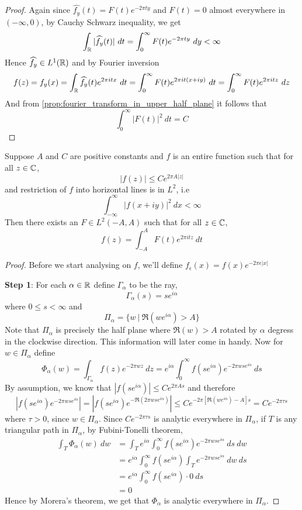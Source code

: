 \begin{proof}
  Again since $\widehat{f_y}(t) = F(t)e^{-2\pi ty}$ and $F(t) = 0$ almost everywhere in $(-\infty, 0)$, by Cauchy Schwarz inequality, we get
  $$\int_\mathbb R |\widehat{f_y}(t)| \ dt = \int_{0}^\infty F(t) e^{-2\pi ty} \ dy < \infty$$
  Hence $\widehat{f_y} \in L^1(\mathbb R)$ and by Fourier inversion
  $$f(z) = f_y(x) = \int_\mathbb R \widehat{f_y}(t) e^{2\pi it x}\ dt = \int_0^\infty F(t)e^{2\pi it(x+iy)} \ dt = \int_{0}^\infty F(t)e^{2\pi itz} \ dz$$
  And from \autoref{prop:fourier_transform_in_upper_half_plane} it follows that $$\int_0^\infty |F(t)|^2 \ dt = C$$
\end{proof}

\begin{theorem}
  \label{thm:paley_wiener_2}
  Suppose $A$ and $C$ are positive constants and $f$ is an entire function such that for all $z \in \mathbb C$, $$|f(z)| \le Ce^{2\pi A |z|}$$
  and restriction of $f$ into horizontal lines is in $L^2$, i.e $$\int_{-\infty}^\infty |f(x +iy)|^2 \ dx < \infty$$
  Then there exists an $F \in L^2(-A, A)$ such that for all $z\in \mathbb C$, $$f(z) = \int_{-A}^A F(t)e^{2 \pi it z} \ dt $$
\end{theorem}
\begin{proof}
  Before we start analysing on $f$, we'll define $f_\epsilon(x) = f(x)e^{-2\pi \epsilon |x|}$

  \textbf{Step 1}: For each $\alpha \in \mathbb R$ define $\Gamma_\alpha$ to be the ray, $$\Gamma_\alpha(s) = se^{i\alpha}$$
  where $0\le s <\infty$ and $$\Pi_\alpha = \{w\ | \ \Re(we^{i\alpha}) > A\}$$
  Note that $\Pi_\alpha$ is precisely the half plane where $\Re(w) > A$ rotated by $\alpha$ degress in the clockwise direction. This information will later come in handy. Now for $w \in \Pi_\alpha$ define $$ \Phi_\alpha(w) = \int_{\Gamma_\alpha} f(z) e^{-2\pi wz} \ dz = e^{i\alpha}\int_0^\infty f(se^{i\alpha})e^{-2\pi wse^{i\alpha}} \ ds$$
  By assumption, we know that $\left|f(se^{i\alpha})\right| \le Ce^{2\pi As}$ and therefore $$\left|f(se^{i\alpha})e^{-2\pi wse^{i\alpha}}\right| = \left|f(se^{i\alpha})e^{-\Re(2\pi wse^{i\alpha})}\right| \le Ce^{-2\pi[\Re(we^{i\alpha}) - A]s} = Ce^{-2\pi \tau s}$$
  where $\tau > 0$, since $w \in \Pi_\alpha$. Since $Ce^{-2\pi \tau s}$ is analytic everywhere in $\Pi_\alpha$, if $T$ is any triangular path in $\Pi_\alpha$, by Fubini-Tonelli theorem,
  \begin{align*}
    \int_T \Phi_\alpha(w) \ dw &= \int_T e^{i\alpha} \int_0^\infty f(se^{i\alpha}) e^{-2\pi w s e^{i\alpha}} \ ds \ dw \\
    & = e^{i\alpha}\int_0^\infty f(se^{i\alpha}) \int_T e^{-2\pi wse^{i\alpha}} \ dw \ ds \\
    & = e^{i\alpha} \int_0^\infty f(se^{i\alpha}) \cdot 0 \ ds \\
    & = 0
  \end{align*}
  Hence by Morera's theorem, we get that $\Phi_\alpha$ is analytic everywhere in $\Pi_\alpha$.

\end{proof}






